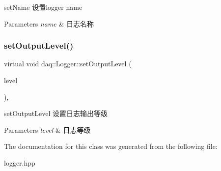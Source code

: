 set\+Name 设置logger name 


\begin{DoxyParams}{Parameters}
{\em name} & 日志名称 \\
\hline
\end{DoxyParams}
\mbox{\label{classdaq_1_1Logger_aba27cec75533c4a625453a80d10d8f5b}} 
\subsubsection{\texorpdfstring{set\+Output\+Level()}{setOutputLevel()}}
{\footnotesize\ttfamily virtual void daq\+::\+Logger\+::set\+Output\+Level (\begin{DoxyParamCaption}\item[{Log\+Level}]{level }\end{DoxyParamCaption})\hspace{0.3cm}{\ttfamily [inline]}, {\ttfamily [virtual]}}



set\+Output\+Level 设置日志输出等级 


\begin{DoxyParams}{Parameters}
{\em level} & 日志等级 \\
\hline
\end{DoxyParams}


The documentation for this class was generated from the following file\+:\begin{DoxyCompactItemize}
\item 
logger.\+hpp\end{DoxyCompactItemize}
